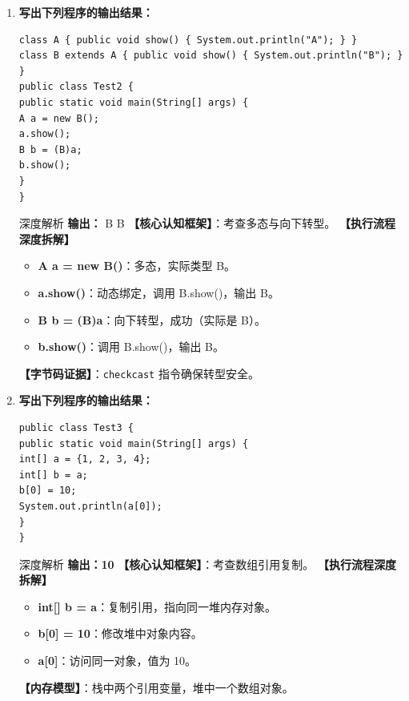 \documentclass[12pt, a4paper]{ctexart}
\newcommand{\code}[1]{\texttt{#1}}
\begin{document}
\begin{enumerate}[label=\textbf{\arabic*.}, itemsep=1em]
    \item \textbf{写出下列程序的输出结果：}
    \begin{lstlisting}[style=JavaExam]
class A { public void show() { System.out.println("A"); } }
class B extends A { public void show() { System.out.println("B"); } }
public class Test2 {
public static void main(String[] args) {
A a = new B();
a.show();
B b = (B)a;
b.show();
}
}
    \end{lstlisting}
    \begin{bluebox}{深度解析}
    \textbf{输出：}
    B
    B
    \textbf{【核心认知框架】}：考查多态与向下转型。
    \textbf{【执行流程深度拆解】}
    \begin{itemize}[leftmargin=*, nosep]
        \item \textbf{A a = new B()}：多态，实际类型 B。
        \item \textbf{a.show()}：动态绑定，调用 B.show()，输出 B。
        \item \textbf{B b = (B)a}：向下转型，成功（实际是 B）。
        \item \textbf{b.show()}：调用 B.show()，输出 B。
    \end{itemize}
    \textbf{【字节码证据】}：\code{checkcast} 指令确保转型安全。
    \end{bluebox}

    \item \textbf{写出下列程序的输出结果：}
    \begin{lstlisting}[style=JavaExam]
public class Test3 {
public static void main(String[] args) {
int[] a = {1, 2, 3, 4};
int[] b = a;
b[0] = 10;
System.out.println(a[0]);
}
}
    \end{lstlisting}
    \begin{bluebox}{深度解析}
    \textbf{输出：10}
    \textbf{【核心认知框架】}：考查数组引用复制。
    \textbf{【执行流程深度拆解】}
    \begin{itemize}[leftmargin=*, nosep]
        \item \textbf{int[] b = a}：复制引用，指向同一堆内存对象。
        \item \textbf{b[0] = 10}：修改堆中对象内容。
        \item \textbf{a[0]}：访问同一对象，值为 10。
    \end{itemize}
    \textbf{【内存模型】}：栈中两个引用变量，堆中一个数组对象。
    \end{bluebox}


\end{enumerate}
\end{document}
